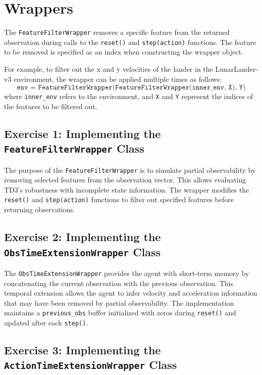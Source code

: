 \documentclass[12pt, a4paper]{article}
\begin{document}
\section{Wrappers}

The \texttt{FeatureFilterWrapper} removes a specific feature from the returned observation during calls to the \texttt{reset()} and \texttt{step(action)} functions. The feature to be removed is specified as an index when constructing the wrapper object.

For example, to filter out the x and y velocities of the lander in the LunarLander-v3 environment, the wrapper can be applied multiple times as follows:
\[
\texttt{env = FeatureFilterWrapper(FeatureFilterWrapper(inner\_env, X), Y)}
\]
where \texttt{inner\_env} refers to the environment, and \texttt{X} and \texttt{Y} represent the indices of the features to be filtered out.

\subsection{Exercise 1: Implementing the \texttt{FeatureFilterWrapper} Class}

The purpose of the \texttt{FeatureFilterWrapper} is to simulate partial observability by removing selected features from the observation vector. This allows evaluating TD3’s robustness with incomplete state information. The wrapper modifies the \texttt{reset()} and \texttt{step(action)} functions to filter out specified features before returning observations. 

\subsection{Exercise 2: Implementing the \texttt{ObsTimeExtensionWrapper} Class}

The \texttt{ObsTimeExtensionWrapper} provides the agent with short-term memory by concatenating the current observation with the previous observation. This temporal extension allows the agent to infer velocity and acceleration information that may have been removed by partial observability. The implementation maintains a \texttt{previous\_obs} buffer initialized with zeros during \texttt{reset()} and updated after each \texttt{step()}. 

\subsection{Exercise 3: Implementing the \texttt{ActionTimeExtensionWrapper} Class}
\end{document}
